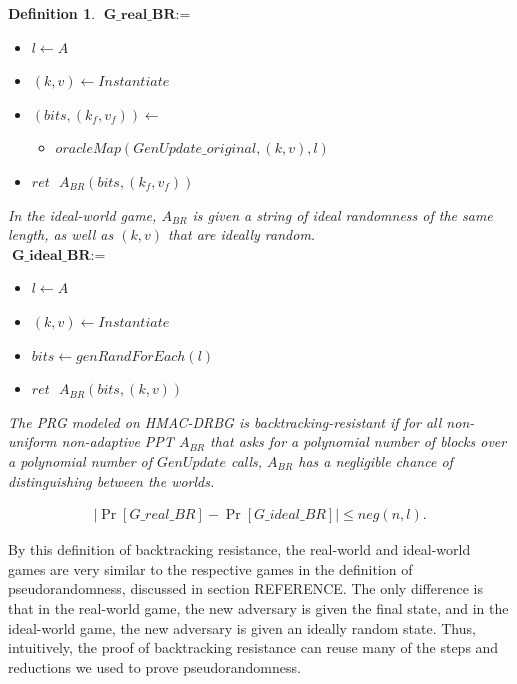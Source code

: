 \documentclass[12pt,lot, lof]{puthesis}
\newenvironment{game}
{ \begin{itemize}[noitemsep,nolistsep] 
}
{ \end{itemize}                  }
\newcommand{\s} {\textrm{ }}
\newcommand{\lar}{\leftarrow}
\newtheorem{dfn}[thm]{Definition}
\begin{document}
{\begin{dfn}
$\textbf{G\_real\_BR} := $
\begin{game}
\item[] $l \leftarrow A$
\item[] $(k,v) \leftarrow Instantiate$
\item[] $(bits, (k_f, v_f)) \lar$
  \begin{game}
    \item[] $oracleMap(GenUpdate\_original,(k, v),l)$
  \end{game}
\item[] $ret \s A_{BR}(bits, (k_f, v_f))$ \\
\end{game}

In the ideal-world game, $A_{BR}$ is given a string of ideal randomness of the same length, as well as $(k,v)$ that are ideally random.\\

$\textbf{G\_ideal\_BR} := $
\begin{game}
\item[] $l \leftarrow A$ 
\item[] $(k,v) \leftarrow Instantiate$
\item[] $bits \leftarrow genRandForEach(l)$
\item[] $ret \s A_{BR}(bits, (k,v))$ \\
\end{game}

The PRG modeled on HMAC-DRBG is backtracking-resistant if for all non-uniform non-adaptive PPT $A_{BR}$ that asks for a polynomial number of blocks over a polynomial number of $GenUpdate$ calls, $A_{BR}$ has a negligible chance of distinguishing between the worlds.

\begin{gather*}
|\Pr[G\_real\_BR] - \Pr[G\_ideal\_BR]| \leq neg(n, l).
\end{gather*}
\end{dfn}

By this definition of backtracking resistance, the real-world and ideal-world games are very similar to the respective games in the definition of pseudorandomness, discussed in section REFERENCE. The only difference is that in the real-world game, the new adversary is given the final state, and in the ideal-world game, the new adversary is given an ideally random state. Thus, intuitively, the proof of backtracking resistance can reuse many of the steps and reductions we used to prove pseudorandomness.


}
\end{document}
